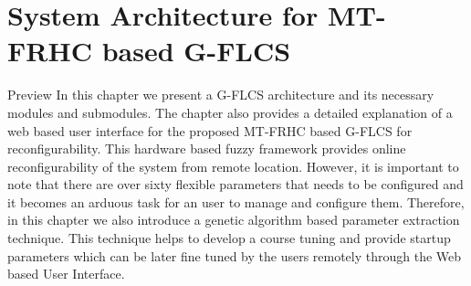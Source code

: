 \chapter{System Architecture for MT\hyp{}FRHC based G\hyp{}FLCS}

\begin{chapterAbstract}{Preview}
	In this chapter we present a G\hyp{}FLCS architecture and its necessary modules and submodules. The chapter also provides a detailed explanation of a web based user interface for the proposed MT\hyp{}FRHC based G\hyp{}FLCS for reconfigurability. This hardware based fuzzy framework provides online reconfigurability of the system from remote location. However, it is important to note that there are over sixty flexible parameters that needs to be configured and it becomes an arduous task for an user to manage and configure them. Therefore, in this chapter we also introduce a genetic algorithm based parameter extraction technique. This technique helps to develop a course tuning and provide startup parameters which can be later fine tuned by the users remotely through the Web based User Interface. 	
\end{chapterAbstract}
\clearpage


